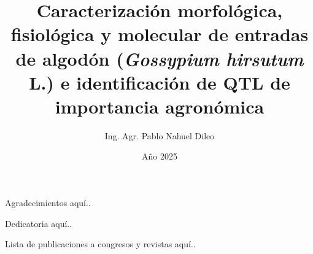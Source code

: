 \documentclass[12pt,oneside]{reedthesis}
\title{Caracterización morfológica, fisiológica y molecular de entradas de algodón (\emph{Gossypium hirsutum} L.) e identificación de QTL de importancia agronómica}
\author{Ing. Agr. Pablo Nahuel Dileo}
\date{Año 2025}
\begin{document}
\frontmatter 
\pagestyle{empty} %
\fancyfoot[R]{\thepage}

  \maketitle

  \begin{acknowledgements}
    Agradecimientos aquí..
    \thispagestyle{fancy} %
    \fancyhf{} %
    \fancyhead{} %
    \fancyfoot[R]{\thepage} %
  \end{acknowledgements}

  \begin{dedication}
    Dedicatoria aquí..
    \thispagestyle{fancy} %
    \fancyhf{} %
    \fancyhead{} %
    \fancyfoot[R]{\thepage} %
  \end{dedication}

  \begin{publications}
    Lista de publicaciones a congresos y revistas aquí..
    \thispagestyle{fancy} %
    \fancyhf{} %
    \fancyhead{} %
    \fancyfoot[R]{\thepage} %
  \end{publications}

  \hypersetup{linkcolor=black}
  \setcounter{secnumdepth}{2}
  \setcounter{tocdepth}{2}
  \tableofcontents
  \thispagestyle{fancy} %
    \fancyhf{} %
    \fancyhead{} %
    \fancyfoot[R]{\thepage} %
\end{document}
